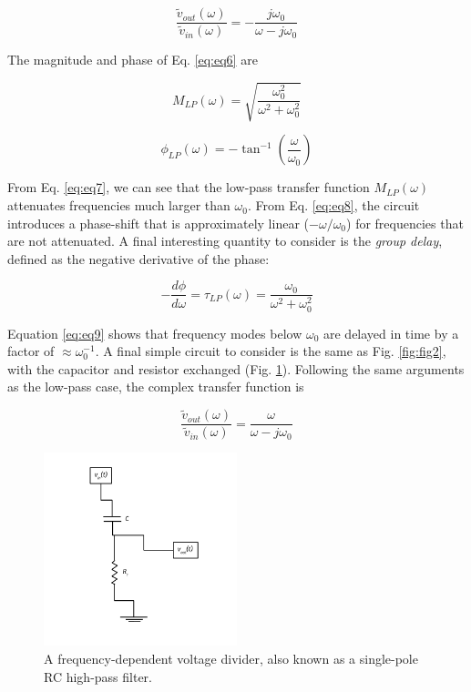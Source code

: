 \documentclass[12pt]{article}
\begin{document}
\begin{equation}
\frac{\tilde{v}_{out}(\omega)}{\tilde{v}_{in}(\omega)} = -\frac{j\omega_0}{\omega - j\omega_0}
\label{eq:eq6}
\end{equation}

The magnitude and phase of Eq. \ref{eq:eq6} are

\begin{equation}
\boxed{
M_{LP}(\omega) = \sqrt{\frac{\omega_0^2}{\omega^2+\omega_0^2}}
}
\label{eq:eq7}
\end{equation}

\begin{equation}
\boxed{
\phi_{LP}(\omega) = -\tan^{-1}\left(\frac{\omega}{\omega_0}\right)
}
\label{eq:eq8}
\end{equation}

From Eq. \ref{eq:eq7}, we can see that the low-pass transfer function $M_{LP}(\omega)$ attenuates frequencies much larger than $\omega_0$.  From Eq. \ref{eq:eq8}, the circuit introduces a phase-shift that is approximately linear ($-\omega/\omega_0$) for frequencies that are not attenuated.  A final interesting quantity to consider is the \textit{group delay}, defined as the negative derivative of the phase:

\begin{equation}
\boxed{
-\frac{d\phi}{d\omega} = \tau_{LP}(\omega) = \frac{\omega_0}{\omega^2+\omega_0^2}
}
\label{eq:eq9}
\end{equation}

Equation \ref{eq:eq9} shows that frequency modes below $\omega_0$ are delayed in time by a factor of $\approx \omega_0^{-1}$.  A final simple circuit to consider is the same as Fig. \ref{fig:fig2}, with the capacitor and resistor exchanged (Fig. \ref{fig:fig3}).  Following the same arguments as the low-pass case, the complex transfer function is

\begin{equation}
\frac{\tilde{v}_{out}(\omega)}{\tilde{v}_{in}(\omega)} = \frac{\omega}{\omega - j\omega_0}
\label{eq:trans3}
\end{equation}

\begin{figure}
\centering
\includegraphics[width=0.5\textwidth,trim=0cm 1cm 0cm 0cm,clip=true]{HighPass.pdf}
\caption{\label{fig:fig3} A frequency-dependent voltage divider, also known as a single-pole RC high-pass filter.}
\end{figure}
\end{document}
